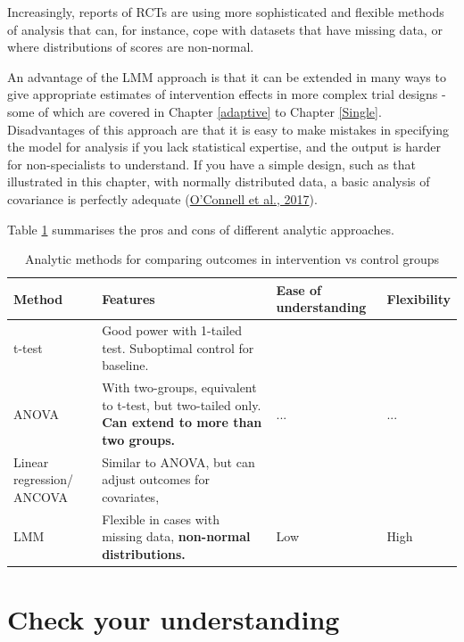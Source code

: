 \documentclass{krantz}
\begin{document}
Increasingly, reports of RCTs are using more sophisticated and flexible methods of analysis that can, for instance, cope with datasets that have missing data, or where distributions of scores are non-normal.

An advantage of the LMM approach is that it can be extended in many ways to give appropriate estimates of intervention effects in more complex trial designs - some of which are covered in Chapter \ref{adaptive} to Chapter \ref{Single}. Disadvantages of this approach are that it is easy to make mistakes in specifying the model for analysis if you lack statistical expertise, and the output is harder for non-specialists to understand. If you have a simple design, such as that illustrated in this chapter, with normally distributed data, a basic analysis of covariance is perfectly adequate (\protect\hyperlink{ref-oconnell2017}{O'Connell et al., 2017}).

Table \ref{tab:table-procon} summarises the pros and cons of different analytic approaches.

\begin{table}

\caption{\label{tab:table-procon}Analytic methods for comparing outcomes in intervention vs control groups}
\centering
\begin{tabular}[t]{>{\centering\arraybackslash}p{7em}>{\centering\arraybackslash}p{12em}>{\centering\arraybackslash}p{7em}>{\centering\arraybackslash}p{7em}}
\toprule
Method & Features & Ease of understanding & Flexibility\\
\midrule
t-test & Good power with 1-tailed test. 
Suboptimal control for baseline. 
\textbf{\cellcolor{gray!6}{Assumes normality.}} & \cellcolor{gray!6}{High} & \cellcolor{gray!6}{Low}\\
ANOVA & With two-groups, equivalent to t-test, 
but two-tailed only. 
\textbf{Can extend to more than two groups.} & ... & ...\\
Linear regression/ ANCOVA & Similar to ANOVA, but can adjust 
outcomes for covariates, 
\textbf{\cellcolor{gray!6}{including baseline.}} & \cellcolor{gray!6}{...} & \cellcolor{gray!6}{...}\\
LMM & Flexible in cases with missing data, 
\textbf{non-normal distributions.} & Low & High\\
\bottomrule
\end{tabular}
\end{table}

\hypertarget{check-your-understanding-11}{%
\section{Check your understanding}\label{check-your-understanding-11}}
\end{document}
